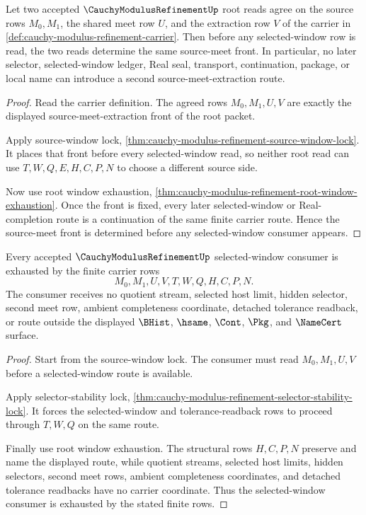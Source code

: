 \begin{theorem}
\label{thm:cauchy-modulus-refinement-root-source-meet-determinacy}
Let two accepted $\CauchyModulusRefinementUp$ root reads agree on the source rows $M_0,M_1$, the shared meet row $U$, and the extraction row $V$ of the carrier in \autoref{def:cauchy-modulus-refinement-carrier}. Then before any selected-window row is read, the two reads determine the same source-meet front. In particular, no later selector, selected-window ledger, Real seal, transport, continuation, package, or local name can introduce a second source-meet-extraction route.
\end{theorem}
\begin{proof}
Read the carrier definition. The agreed rows $M_0,M_1,U,V$ are exactly the displayed source-meet-extraction front of the root packet.

Apply source-window lock, \autoref{thm:cauchy-modulus-refinement-source-window-lock}. It places that front before every selected-window read, so neither root read can use $T,W,Q,E,H,C,P,N$ to choose a different source side.

Now use root window exhaustion, \autoref{thm:cauchy-modulus-refinement-root-window-exhaustion}. Once the front is fixed, every later selected-window or Real-completion route is a continuation of the same finite carrier route. Hence the source-meet front is determined before any selected-window consumer appears.
\end{proof}

\begin{theorem}
\label{thm:cauchy-modulus-refinement-window-consumer-coverage}
Every accepted $\CauchyModulusRefinementUp$ selected-window consumer is exhausted by the finite carrier rows
$$
M_0,M_1,U,V,T,W,Q,H,C,P,N.
$$
The consumer receives no quotient stream, selected host limit, hidden selector, second meet row, ambient completeness coordinate, detached tolerance readback, or route outside the displayed $\BHist$, $\hsame$, $\Cont$, $\Pkg$, and $\NameCert$ surface.
\end{theorem}
\begin{proof}
Start from the source-window lock. The consumer must read $M_0,M_1,U,V$ before a selected-window route is available.

Apply selector-stability lock, \autoref{thm:cauchy-modulus-refinement-selector-stability-lock}. It forces the selected-window and tolerance-readback rows to proceed through $T,W,Q$ on the same route.

Finally use root window exhaustion. The structural rows $H,C,P,N$ preserve and name the displayed route, while quotient streams, selected host limits, hidden selectors, second meet rows, ambient completeness coordinates, and detached tolerance readbacks have no carrier coordinate. Thus the selected-window consumer is exhausted by the stated finite rows.
\end{proof}

